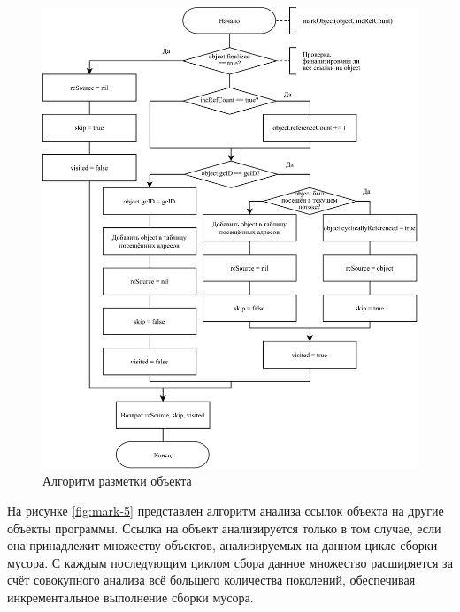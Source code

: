 \begin{figure}[H]
	\centering
	\includegraphics[width=\textwidth]{assets/mark-4.png}
	\caption{Алгоритм разметки объекта}
	\label{fig:mark-4}
\end{figure}

На рисунке \ref{fig:mark-5} представлен алгоритм анализа ссылок объекта на другие объекты программы. Ссылка на объект анализируется только в том случае, если она принадлежит множеству объектов, анализируемых на данном цикле сборки мусора. С каждым последующим циклом сбора данное множество расширяется за счёт совокупного анализа всё большего количества поколений, обеспечивая инкрементальное выполнение сборки мусора.

